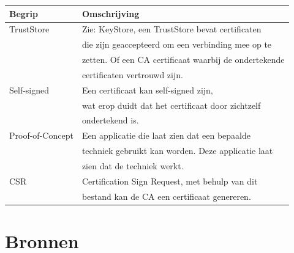 \documentclass[]{article}
\begin{document}
\begin{tabular}{|| l | l ||}\hline
    Begrip           & Omschrijving                                         \\\hline\hline
    TrustStore       & Zie: KeyStore, een TrustStore bevat certificaten     \\
                     & die zijn geaccepteerd om een verbinding mee op te    \\
                     & zetten. Of een CA certificaat waarbij de ondertekende\\
                     & certificaten vertrouwd  zijn.                        \\\hline
    Self-signed      & Een certificaat kan self-signed zijn,                \\
                     & wat erop duidt dat het certificaat door zichtzelf    \\
                     & ondertekend is.                                      \\\hline
    Proof-of-Concept & Een applicatie die laat zien dat een bepaalde        \\
                     & techniek gebruikt kan worden. Deze applicatie laat   \\
                     & zien dat de techniek werkt.                   \\\hline
    CSR              & Certification Sign Request, met behulp van dit       \\
                     & bestand kan de CA een certificaat genereren.         \\\hline
\end{tabular}

\newpage
\section{Bronnen}
\end{document}
